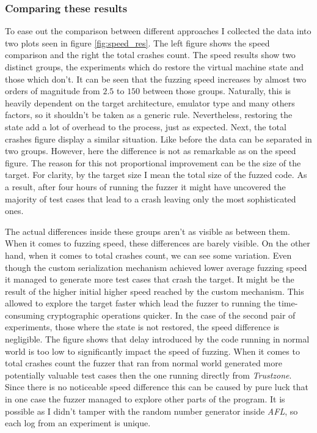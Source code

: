 \subsubsection{Comparing these results}
To ease out the comparison between different approaches I collected the data into two plots seen in figure \ref{fig:speed_res}. The left figure shows the speed comparison and the right the total crashes count. The speed results show two distinct groups, the experiments which do restore the virtual machine state and those which don't. It can be seen that the fuzzing speed increases by almost two orders of magnitude from $2.5$ to $150$ between those groups. Naturally, this is heavily dependent on the target architecture, emulator type and many others factors, so it shouldn't be taken as a generic rule. Nevertheless, restoring the state add a lot of overhead to the process, just as expected. Next, the total crashes figure display a similar situation. Like before the data can be separated in two groups. However, here the difference is not as remarkable as on the speed figure. The reason for this not proportional improvement can be the size of the target. For clarity, by the target size I mean the total size of the fuzzed code. As a result, after four hours of running the fuzzer it might have uncovered the majority of test cases that lead to a crash leaving only the most sophisticated ones.

The actual differences inside these groups aren't as visible as between them. When it comes to fuzzing speed, these differences are barely visible. On the other hand, when it comes to total crashes count, we can see some variation. Even though the custom serialization mechanism achieved lower average fuzzing speed it managed to generate more test cases that crash the target. It might be the result of the higher initial higher speed reached by the custom mechanism. This allowed to explore the target faster which lead the fuzzer to running the time-consuming cryptographic operations quicker. In the case of the second pair of experiments, those where the state is not restored, the speed difference is negligible. The figure shows that delay introduced by the code running in normal world is too low to significantly impact the speed of fuzzing. When it comes to total crashes count the fuzzer that ran from normal world generated more potentially valuable test cases then the one running directly from \textit{Trustzone}. Since there is no noticeable speed difference this can be caused by pure luck that in one case the fuzzer managed to explore other parts of the program. It is possible as I didn't tamper with the random number generator inside \textit{AFL}, so each log from an experiment is unique.

